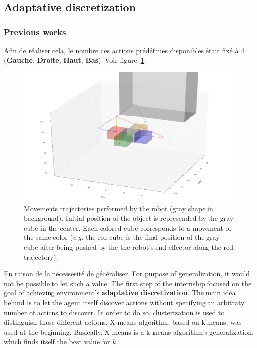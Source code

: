 \documentclass{llncs}
\begin{document}




\subsection{Adaptative discretization}



\subsubsection{Previous works}

Afin de réaliser cela, le nombre des actions prédéfinies disponibles était fixé à 4 (\textbf{Gauche}, \textbf{Droite}, \textbf{Haut}, \textbf{Bas}). Voir figure~\ref{fig:trajectories}.

\begin{figure}
	\centering
	\includegraphics[width=\textwidth]{figures/trajectories}
	\caption{Movements trajectories performed by the robot (gray shape in background). Initial position of the object is represended by the gray cube in the center. Each colored cube corresponds to a movement of the same color (\textit{e.g.} the red cube is the final position of the gray cube after being pushed by the the robot's end effector along the red trajectory).}
	\label{fig:trajectories}
\end{figure}

En raison de la nécessesité de généraliser,
For purpose of generalization, it would not be possible to let such a value. The first step of the internship focused on the goal of achieving environment's \textbf{adaptative discretization}. The main idea behind is to let the agent itself discover actions without specifying an arbitraty number of actions to discover.  In order to do so, clusterization is used to distinguish those different actions. X-means algorithm\cite{Pelleg:2000:XEK:645529.657808}, based on k-means, was used at the beginning. Basically, X-means is a k-means algorithm's generalization, which finds itself the best value for $k$.
\end{document}
